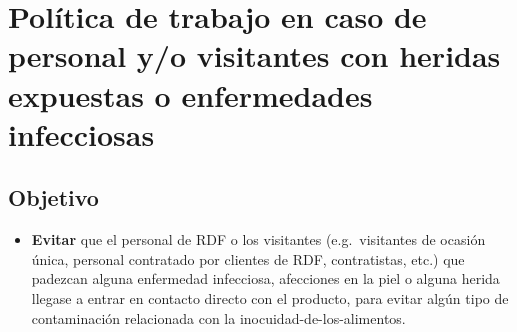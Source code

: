 \thispagestyle{formato-PI}
\renewcommand{\MayorVer}{2}
\renewcommand{\MenorVer}{1}

\renewcommand{\Codigo}{BPD-8-POL}
\renewcommand{\FechaPub}{2023--01}



\renewcommand{\Titulo}{\small{Política de personal y/o visitantes con heridas expuestas o enfermedades infecciosas}}
\section{Política de trabajo en caso de personal y/o visitantes con heridas expuestas o enfermedades infecciosas}
\subsection{Objetivo}

\begin{itemize}
	\item \textbf{Evitar} que el personal de \gls{RDF} o los visitantes (e.g.\ visitantes de ocasión única, personal contratado por clientes de \gls{RDF}, contratistas, etc.) que padezcan alguna enfermedad infecciosa, afecciones en la piel o alguna herida llegase a entrar en contacto directo con el producto, para evitar algún tipo de contaminación relacionada con la \gls{inocuidad-de-los-alimentos}.
\end{itemize}

